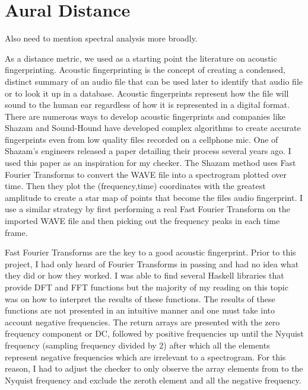 
\section{Aural Distance}

Also need to mention spectral analysis more broadly.

As a distance metric, we used as a starting point the literature on acoustic fingerprinting.
Acoustic fingerprinting is the concept of creating a condensed, distinct summary of an audio file that can be used later to identify that audio file or to look it up in a database.
Acoustic fingerprints represent how the file will sound to the human ear regardless of how it is represented in a digital format.
There are numerous ways to develop acoustic fingerprints and companies like Shazam and Sound-Hound have developed complex algorithms to create accurate fingerprints even from low quality files recorded on a cellphone mic.
One of Shazam’s engineers released a paper detailing their process several years ago.
I used this paper as an inspiration for my checker.
The Shazam method uses Fast Fourier Transforms to convert the WAVE file into a spectrogram plotted over time.
Then they plot the (frequency,time) coordinates with the greatest amplitude to create a star map of points that become the files audio fingerprint.
I use a similar strategy by first performing a real Fast Fourier Transform on the imported WAVE file and then picking out the frequency peaks in each time frame.


Fast Fourier Transforms are the key to a good acoustic fingerprint.
Prior to this project, I had only heard of Fourier Transforms in passing and had no idea what they did or how they worked.
I was able to find several Haskell libraries that provide DFT and FFT functions but the majority of my reading on this topic was on how to interpret the results of these functions.
The results of these functions are not presented in an intuitive manner and one must take into account negative frequencies.
The return arrays are presented with the zero frequency component or DC, followed by positive frequencies up until the Nyquist frequency (sampling frequency divided by 2) after which all the elements represent negative frequencies which are irrelevant to a spectrogram.
For this reason, I had to adjust the checker to only observe the array elements from to the Nyquist frequency and exclude the zeroth element and all the negative frequency.

